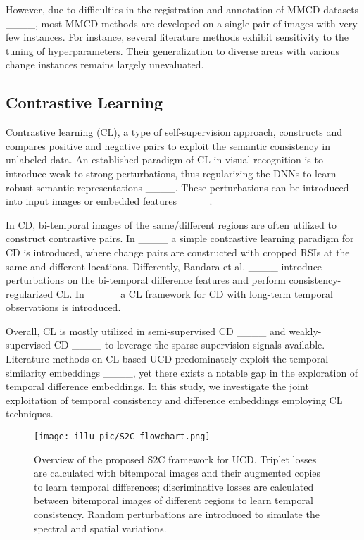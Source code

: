 However, due to difficulties in the registration and annotation of MMCD datasets ____, most MMCD methods are developed on a single pair of images with very few instances. For instance, several literature methods exhibit sensitivity to the tuning of hyperparameters. Their generalization to diverse areas with various change instances remains largely unevaluated.

\subsection{Contrastive Learning}

Contrastive learning (CL), a type of self-supervision approach, constructs and compares positive and negative pairs to exploit the semantic consistency in unlabeled data. An established paradigm of CL in visual recognition is to introduce weak-to-strong perturbations, thus regularizing the DNNs to learn robust semantic representations ____. These perturbations can be introduced into input images or embedded features ____.

In CD, bi-temporal images of the same/different regions are often utilized to construct contrastive pairs. In ____ a simple contrastive learning paradigm for CD is introduced, where change pairs are constructed with cropped RSIs at the same and different locations. Differently, Bandara et al. ____ introduce perturbations on the bi-temporal difference features and perform consistency-regularized CL. In ____ a CL framework for CD with long-term temporal observations is introduced.

Overall, CL is mostly utilized in semi-supervised CD ____ and weakly-supervised CD ____ to leverage the sparse supervision signals available. Literature methods on CL-based UCD predominately exploit the temporal similarity embeddings ____, yet there exists a notable gap in the exploration of temporal difference embeddings. In this study, we investigate the joint exploitation of temporal consistency and difference embeddings employing CL techniques.

\begin{figure*}[!t]
\centering
    \texttt{[image: illu\_pic/S2C\_flowchart.png]}
    \caption{Overview of the proposed S2C framework for UCD. Triplet losses are calculated with bitemporal images and their augmented copies to learn temporal differences; discriminative losses are calculated between bitemporal images of different regions to learn temporal consistency. Random perturbations are introduced to simulate the spectral and spatial variations.}
\label{fig.flowchar}
\end{figure*}


